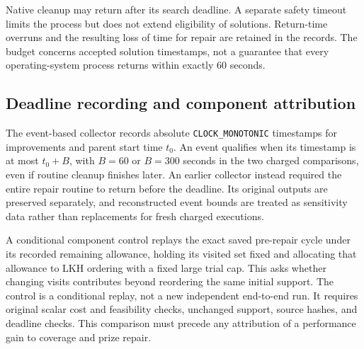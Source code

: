 Native cleanup may return after its search deadline. A separate safety timeout
limits the process but does not extend eligibility of solutions. Return-time
overruns and the resulting loss of time for repair are retained in the records.
The budget concerns accepted solution timestamps, not a guarantee that every
operating-system process returns within exactly $60$ seconds.

\subsection{Deadline recording and component attribution}
The event-based collector records absolute \texttt{CLOCK\_MONOTONIC}
timestamps for improvements and parent start time $t_0$. An event qualifies
when its timestamp is at most $t_0+B$, with $B=60$ or $B=300$ seconds in the
two charged comparisons, even if routine cleanup finishes later.
An earlier collector instead required the entire repair routine to return
before the deadline. Its original outputs are preserved separately, and
reconstructed event bounds are treated as sensitivity data rather than
replacements for fresh charged executions.

A conditional component control replays the exact saved pre-repair cycle
under its recorded remaining allowance, holding its visited set fixed and
allocating that allowance to LKH ordering with a fixed large trial cap.
This asks whether changing visits contributes beyond reordering the same
initial support. The control is a conditional replay, not a new independent
end-to-end run. It requires original scalar cost and feasibility checks,
unchanged support, source hashes, and deadline checks. This comparison must
precede any attribution of a performance gain to coverage and prize repair.
